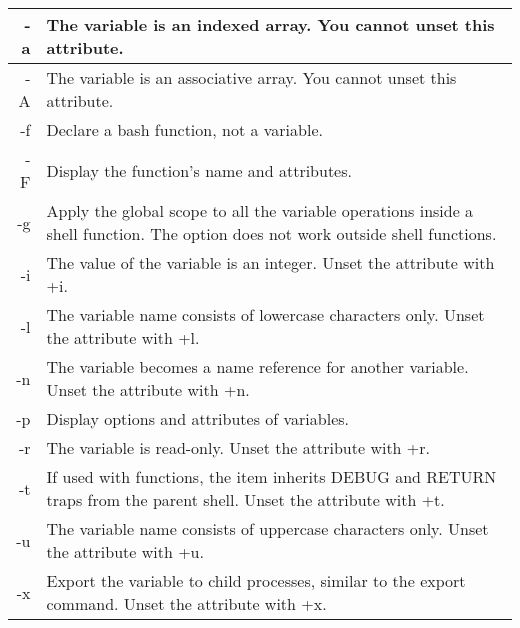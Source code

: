 \documentclass{article}
\begin{document}
\begin{tabularx}{\linewidth}{| r |>{\raggedright\arraybackslash}X|}\hline
	-a & The variable is an indexed array. You cannot unset this attribute.                                                               \\\hline
	-A & The variable is an associative array. You cannot unset this attribute.                                                           \\\hline
	-f & Declare a bash function, not a variable.                                                                                         \\                                                                                        \hline
	-F & Display the function's name and attributes.                                                                                      \\                                                                                     \hline
	-g & Apply the global scope to all the variable operations inside a shell function. The option does not work outside shell functions. \\\hline
	-i & The value of the variable is an integer. Unset the attribute with +i.                                                            \\\hline
	-l & The variable name consists of lowercase characters only. Unset the attribute with +l.                                            \\\hline
	-n & The variable becomes a name reference for another variable. Unset the attribute with +n.                                         \\\hline
	-p & Display options and attributes of variables.                                                                                     \\                                                                                    \hline
	-r & The variable is read-only. Unset the attribute with +r.                                                                          \\\hline
	-t & If used with functions, the item inherits DEBUG and RETURN traps from the parent shell. Unset the attribute with +t.             \\\hline
	-u & The variable name consists of uppercase characters only. Unset the attribute with +u.                                            \\\hline
	-x & Export the variable to child processes, similar to the export command. Unset the attribute with +x.                              \\\hline
\end{tabularx}
\end{document}
